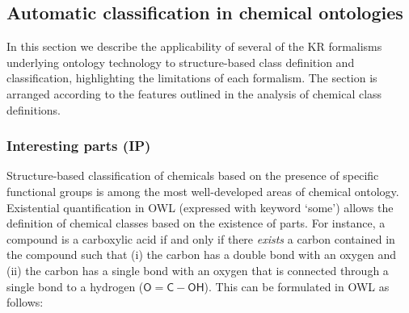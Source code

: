 \documentclass[10pt]{bmc_article}
\newenvironment{bmcformat}{\baselineskip20pt\sloppy\setboolean{publ}{false}}{\baselineskip20pt\sloppy}
\begin{document}
\begin{bmcformat}
\subsection*{Automatic classification in chemical ontologies}
\label{sec:resultschemontology}

In this section we describe the applicability of several of the KR formalisms underlying ontology technology to structure-based class definition and classification, highlighting the limitations of each formalism. The section is arranged according to the features outlined in the analysis of chemical class definitions.

% 


\subsubsection*{Interesting parts (IP)}


Structure-based classification of chemicals based on the presence of specific functional groups is among the most well-developed areas of chemical ontology. Existential quantification in OWL (expressed with keyword `some') allows the definition of chemical classes based on the existence of parts. For instance, a compound is a carboxylic acid if and only if there \emph{exists} a carbon contained in the compound such that (i) the carbon has a double bond with an oxygen and (ii) the carbon has a single bond with an oxygen that is connected through a single bond to a hydrogen ($\mathsf{O=C-OH}$). This can be formulated in OWL as follows:

%


\end{bmcformat}
\end{document}
